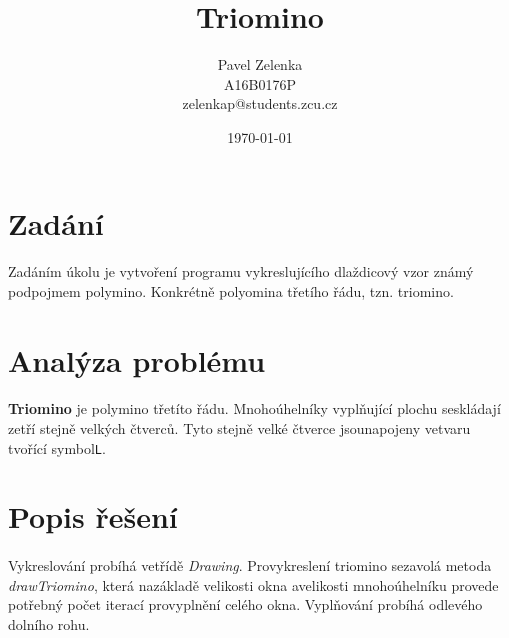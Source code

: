 \documentclass[12pt]{scrartcl}
\author{Pavel Zelenka\\A16B0176P\\zelenkap@students.zcu.cz}
\date{\today}
\title{Triomino}
\begin{document}
\maketitle
{}
\newpage
{}
\newpage
\section{Zadání}
	
\paragraph{}
Zadáním úkolu je vytvoření programu vykreslujícího dlaždicový vzor známý pod\nobreakspace pojmem polymino. Konkrétně polyomina třetího řádu, tzn. triomino.


\section{Analýza problému}

\paragraph{}
\textbf{Triomino} je polymino třetíto řádu. Mnohoúhelníky vyplňující plochu se\nobreakspace skládají ze\nobreakspace tří stejně velkých čtverců. Tyto stejně velké čtverce jsou\nobreakspace napojeny ve\nobreakspace tvaru tvořící symbol\nobreakspace \texttt{L}.

\section{Popis řešení}

\paragraph{}
Vykreslování probíhá ve\nobreakspace třídě \emph{Drawing}. Pro\nobreakspace vykreslení triomino se\nobreakspace zavolá metoda \emph{\mbox{drawTriomino}}, která na\nobreakspace základě velikosti okna a\nobreakspace velikosti mnohoúhelníku provede potřebný počet iterací pro\nobreakspace vyplnění celého okna. Vyplňování probíhá od\nobreakspace levého dolního rohu.
\end{document}
